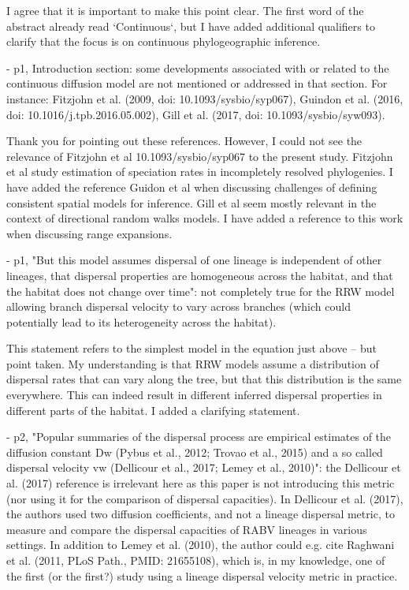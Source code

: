 \documentclass[11pt, oneside]{article}   	%
\newcommand{\response}[1]{{\color{black}{\bf Response:} #1}}
\begin{document}
\response{I agree that it is important to make this point clear. The first word of the abstract already read `Continuous`, but I have added additional qualifiers to clarify that the focus is on continuous phylogeographic inference.}

- p1, Introduction section: some developments associated with or related to the continuous diffusion model are not mentioned or addressed in that section. For instance: Fitzjohn et al. (2009, doi: 10.1093/sysbio/syp067), Guindon et al. (2016, doi: 10.1016/j.tpb.2016.05.002), Gill et al. (2017, doi: 10.1093/sysbio/syw093).

\response{Thank you for pointing out these references. However, I could not see the relevance of Fitzjohn et al 10.1093/sysbio/syp067 to the present study. Fitzjohn et al study estimation of speciation rates in incompletely resolved phylogenies. I have added the reference Guidon et al when discussing challenges of defining consistent spatial models for inference. Gill et al seem mostly relevant in the context of directional random walks models. I have added a reference to this work when discussing range expansions.}

- p1, "But this model assumes dispersal of one lineage is independent of other lineages, that dispersal properties are homogeneous across the habitat, and that the habitat does not change over time": not completely true for the RRW model allowing branch dispersal velocity to vary across branches (which could potentially lead to its heterogeneity across the habitat).

\response{This statement refers to the simplest model in the equation just above -- but point taken. My understanding is that RRW models assume a distribution of dispersal rates that can vary along the tree, but that this distribution is the same everywhere. This can indeed result in different inferred dispersal properties in different parts of the habitat. I added a clarifying statement. }


- p2, "Popular summaries of the dispersal process are empirical estimates of the diffusion constant Dw (Pybus et al., 2012; Trovao et al., 2015) and a so called dispersal velocity vw (Dellicour et al., 2017; Lemey et al., 2010)": the Dellicour et al. (2017) reference is irrelevant here as this paper is not introducing this metric (nor using it for the comparison of dispersal capacities). In Dellicour et al. (2017), the authors used two diffusion coefficients, and not a lineage dispersal metric, to measure and compare the dispersal capacities of RABV lineages in various settings. In addition to Lemey et al. (2010), the author could e.g. cite Raghwani et al. (2011, PLoS Path., PMID: 21655108), which is, in my knowledge, one of the first (or the first?) study using a lineage dispersal velocity metric in practice.
\end{document}

